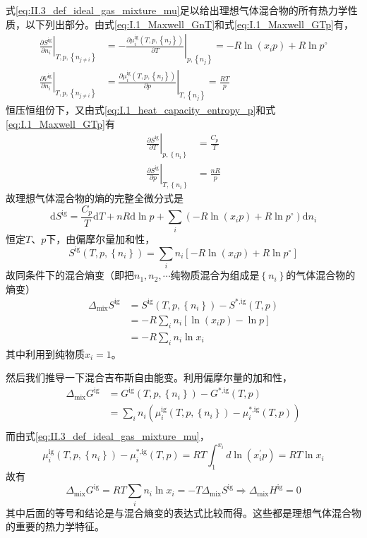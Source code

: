 \documentclass[main.tex]{subfiles}
\begin{document}
式\eqref{eq:II.3_def_ideal_gas_mixture_mu}足以给出理想气体混合物的所有热力学性质，以下列出部分。由式\eqref{eq:I.1_Maxwell_GnT}和式\eqref{eq:I.1_Maxwell_GTp}有，
\begin{align}
    \left.\frac{\partial S^\text{ig}}{\partial n_i}\right|_{T,p,\left\{n_{j\neq i}\right\}} & =-\left.\frac{\partial \mu^\text{ig}_i\left(T,p,\left\{n_j\right\}\right)}{\partial T}\right|_{p,\left\{n_j\right\}}=-R\ln\left(x_ip\right)+R\ln p^\circ \\
    \left.\frac{\partial V^\text{ig}}{\partial n_i}\right|_{T,p,\left\{n_{j\neq i}\right\}} & =\left.\frac{\partial\mu^\text{ig}_i\left(T,p,\left\{n_j\right\}\right)}{\partial p}\right|_{T,\left\{n_j\right\}}=\frac{RT}{p}
\end{align}
恒压恒组份下，又由式\eqref{eq:I.1_heat_capacity_entropy_p}和式\eqref{eq:I.1_Maxwell_GTp}有
\begin{align}
    \left.\frac{\partial S^\text{ig}}{\partial T}\right|_{p,\left\{n_i\right\}} & =\frac{C_p}{T} \\
    \left.\frac{\partial S^\text{ig}}{\partial p}\right|_{T,\left\{n_i\right\}} & =\frac{nR}{p}
\end{align}
故理想气体混合物的熵的完整全微分式是
\[\mathrm{d}S^\text{ig}=\frac{C_p}{T}\mathrm{d}T+nR\mathrm{d}\ln p+\sum_i\left(-R\ln\left(x_ip\right)+R\ln p^\circ\right)\mathrm{d}n_i\]
恒定$T$、$p$下，由偏摩尔量加和性，
\[S^\text{ig}\left(T,p,\left\{n_i\right\}\right)=\sum_in_i\left[-R\ln\left(x_ip\right)+R\ln p^\circ\right]\]
故同条件下的混合熵变（即把$n_1,n_2,\cdots$纯物质混合为组成是$\left\{n_i\right\}$的气体混合物的熵变）
\begin{align*}
    \Delta_\text{mix}S^\text{ig} & =S^\text{ig}\left(T,p,\left\{n_i\right\}\right)-S^\text{*,ig}\left(T,p\right) \\
                                 & =-R\sum_in_i\left[\ln\left(x_ip\right)-\ln p\right]                           \\
                                 & =-R\sum_in_i\ln x_i
\end{align*}
其中利用到纯物质$x_i=1$。

然后我们推导一下混合吉布斯自由能变。利用偏摩尔量的加和性，
\begin{align*}
    \Delta_\text{mix}G^\text{ig} & =G^\text{ig}\left(T,p,\left\{n_i\right\}\right)-G^\text{*,ig}\left(T,p\right)                               \\
                                 & =\sum_in_i\left(\mu_i^\text{ig}\left(T,p,\left\{n_i\right\}\right)-\mu_i^\text{*,ig}\left(T,p\right)\right) \\
\end{align*}
而由式\eqref{eq:II.3_def_ideal_gas_mixture_mu}，
\[\mu_i^\text{ig}\left(T,p,\left\{n_i\right\}\right)-\mu_i^\text{*,ig}\left(T,p\right)=RT\int_{1}^{x_i}d\ln\left(x_i^\prime p\right)=RT\ln x_i\]
故有
\[\Delta_\text{mix}G^\text{ig}=RT\sum_in_i\ln x_i=-T\Delta_\text{mix}S^\text{ig}\Rightarrow\Delta_\text{mix}H^\text{ig}=0\]
其中后面的等号和结论是与混合熵变的表达式比较而得。这些都是理想气体混合物的重要的热力学特征。
\end{document}
